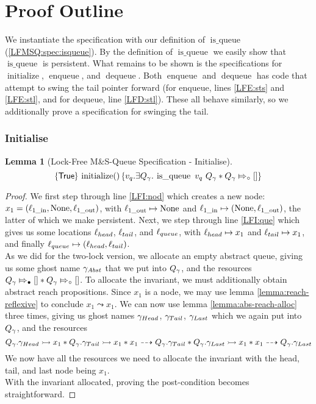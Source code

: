 \documentclass[a4paper, 11pt]{report}
\newtheorem{lemma}[theorem]{Lemma}
\newcommand{\initialise}{\operatorname{initialize}}
\newcommand{\enqueue}{\operatorname{enqueue}}
\newcommand{\dequeue}{\operatorname{dequeue}}
\newcommand{\isqueue}{\operatorname{is\_queue}}
\newcommand{\locin}[1]{\loc_{#1\_\text{in}}}
\newcommand{\locout}[1]{\loc_{#1\_\text{out}}}
\newcommand{\Qg}{Q_\gname}
\newcommand{\abstractstatefullfrag}[2]{#1 \Mapsto_{\circ} #2}
\newcommand{\abstractstateauth}[2]{#1 \Mapsto_{\bullet} #2}
\newcommand{\reach}[2]{#1 \leadsto #2}
\newcommand{\ar}[2]{#1 \dashrightarrow #2}
\newcommand{\ap}[2]{#1 \rightarrowtail #2}
\newcommand{\tlhocapspecinit}{\hoare{\TRUE}{\initialise \TT}{v_q . \Exists Q_\gname . \isqueue\ v_q \ Q_\gname \star \abstractstatefullfrag{\Qg}{[]}}}
\newcommand{\lfhocapspecinit}{\tlhocapspecinit}
\begin{document}
\section{Proof Outline}
\label{LFMSQ:section:proof-outline}

We instantiate the specification with our definition of $\isqueue$ (\ref{LFMSQ:spec:isqueue}). By the definition of $\isqueue$ we easily show that $\isqueue$ is persistent. What remains to be shown is the specifications for $\initialise$, $\enqueue$, and $\dequeue$. Both $\enqueue$ and $\dequeue$ has code that attempt to swing the tail pointer forward (for enqueue, lines \ref{LFE:sts} and \ref{LFE:stl}, and for dequeue, line \ref{LFD:stl}). These all behave similarly, so we additionally prove a specification for swinging the tail.

\subsubsection{Initialise}
\begin{lemma}[Lock-Free M\&S-Queue Specification - Initialise]\label{LFMSQ:spec:init}
  \begin{equation*}
    \lfhocapspecinit
  \end{equation*}
\end{lemma}
\begin{proof}
We first step through line \ref{LFI:nod} which creates a new node: $x_1 = (\locin{1}, \None, \locout{1})$, with $\locout{1} \mapsto \None$ and $\locin{1} \mapsto (\None, \locout{1})$, the latter of which we make persistent. Next, we step through line \ref{LFI:que} which gives us some locations $\ell_{head}$, $\ell_{tail}$, and $\ell_{queue}$, with $\ell_{head} \mapsto x_1$ and $\ell_{tail} \mapsto x_1$, and finally $\ell_{queue} \mapsto (\ell_{head}, \ell_{tail})$.\\
As we did for the two-lock version, we allocate an empty abstract queue, giving us some ghost name $\gamma_{Abst}$ that we put into $\Qg$, and the resources $\abstractstateauth{\Qg}{[]} \star \abstractstatefullfrag{\Qg}{[]}$. To allocate the invariant, we must additionally obtain abstract reach propositions. Since $x_1$ is a node, we may use lemma \ref{lemma:reach-reflexive} to conclude $\reach{x_1}{x_1}$. We can now use lemma \ref{lemma:abs-reach-alloc} three times, giving us ghost names $\gamma_{Head}$, $\gamma_{Tail}$, $\gamma_{Last}$ which we again put into $\Qg$, and the resources
\begin{equation*}
  \ap{\Qg.\gname_{Head}}{x_1} \star \ap{\Qg.\gname_{Tail}}{x_1} \star \ar{x_1}{\Qg.\gname_{Tail}} \star \ap{\Qg.\gname_{Last}}{x_1} \star \ar{x_1}{\Qg.\gname_{Last}}
\end{equation*}
We now have all the resources we need to allocate the invariant with the head, tail, and last node being $x_1$.\\
With the invariant allocated, proving the post-condition becomes straightforward.
\end{proof}
\end{document}
